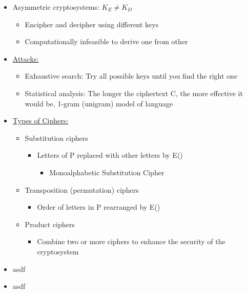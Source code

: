\documentclass[landscape, a4paper]{article}
\begin{document}
\begin{minipage}[t]{0.19\pagewidth}
\begin{itemize}
\begin{itemize}
		\end{itemize}
		\item \alert{Asymmetric cryptosystems:} $K_E \ne K_D$
		\begin{itemize}
			\item Encipher and decipher using different keys
			\item Computationally infeasible to derive one from other
		\end{itemize}
		\item \underline{Attacks:}
		\begin{itemize}
			\item \alert{Exhaustive search:} Try all possible keys until you find the right one
      \item \alert{Statistical analysis:} The longer the ciphertext C, the more effective it would be, 1-gram (unigram) model of language
		\end{itemize}
		\item \underline{Types of Ciphers:}
		\begin{itemize}
			\item \alert{Substitution ciphers}
			\begin{itemize}
				\item Letters of P replaced with other letters by E()
				\begin{itemize}
					\item Monoalphabetic Substitution Cipher
				\end{itemize}
			\end{itemize}
			\item \alert{Transposition (permutation) ciphers}
			\begin{itemize}
				\item Order of letters in P rearranged by E()
			\end{itemize}
			\item \alert{Product ciphers}
			\begin{itemize}
				\item Combine two or more ciphers to enhance the security of the cryptosystem
			\end{itemize}
		\end{itemize}
	\end{itemize}
\end{minipage}
\begin{minipage}[t]{0.19\pagewidth}
	\begin{itemize}
		\item asdf
		\item asdf
	\end{itemize}
\end{minipage}
\end{document}
